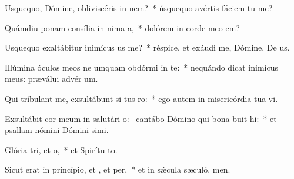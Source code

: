 \item Usquequo, Dómine, obliviscéris  in nem?~* úsquequo avértis fáciem tu  me?
\item Quámdiu ponam consília in nima a,~* dolórem in corde meo  em?
\item Usquequo exaltábitur inimícus us  me?~* réspice, et exáudi me, Dómine, De us.
\item Illúmina óculos meos ne umquam obdórmi in te:~* nequándo dicat inimícus meus: præválui advér um.
\item Qui tríbulant me, exsultábunt si tus ro:~* ego autem in misericórdia tua vi.
\item Exsultábit cor meum in salutári o:~\pscross{} cantábo Dómino qui bona buit hi:~* et psallam nómini Dómini simi.
\item Glória tri, et o,~* et Spirítu to.
\item Sicut erat in princípio, et , et per,~* et in sǽcula sæculó. men.

